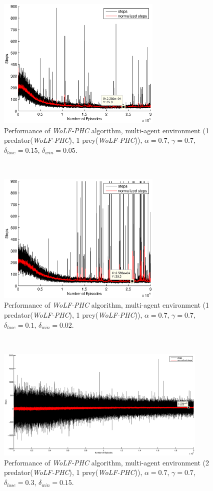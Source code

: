 \documentclass[a4paper,11pt]{article}
\begin{document}
\begin{figure}[ht!]
  \centering
    \includegraphics[width=0.7\textwidth]{figures/w0707015005.eps}
        \caption{Performance of  \textit{WoLF-PHC} algorithm, multi-agent environment (1 predator(\textit{WoLF-PHC}), 1 prey(\textit{WoLF-PHC})), $\alpha = 0.7$, $\gamma = 0.7$, $\delta_{lose} = 0.15$, $\delta_{win} = 0.05$.}
    \label{w113}
\end{figure}
~
\begin{figure}[ht!]
  \centering
    \includegraphics[width=0.7\textwidth]{figures/w070701002.eps}
        \caption{Performance of  \textit{WoLF-PHC} algorithm, multi-agent environment (1 predator(\textit{WoLF-PHC}), 1 prey(\textit{WoLF-PHC})), $\alpha = 0.7$, $\gamma = 0.7$, $\delta_{lose} = 0.1$, $\delta_{win} = 0.02$.}
    \label{w114}
\end{figure}
~
\begin{figure}[ht!]
  \centering
    \includegraphics[width=0.9\textwidth]{figures/w2.eps}
        \caption{Performance of  \textit{WoLF-PHC} algorithm, multi-agent environment (2 predator(\textit{WoLF-PHC}), 1 prey(\textit{WoLF-PHC})), $\alpha = 0.7$, $\gamma = 0.7$, $\delta_{lose} = 0.3$, $\delta_{win} = 0.15$.}
    \label{w2}
\end{figure}
\end{document}
